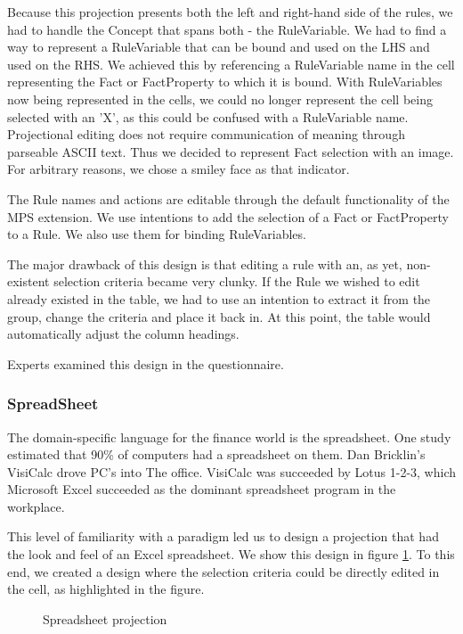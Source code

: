 Because this projection presents both the left and right-hand side of the rules, we had to handle the Concept that spans both - the RuleVariable.
We had to find a way to represent a RuleVariable that can be bound and used on the LHS and used on the RHS.
We achieved this by referencing a RuleVariable name in the cell representing the Fact or FactProperty to which it is bound.
With RuleVariables now being represented in the cells, we could no longer represent the cell being selected with an 'X', as this could be confused with a RuleVariable name.
Projectional editing does not require communication of meaning through parseable ASCII text.
Thus we decided to represent Fact selection with an image.
For arbitrary reasons, we chose a smiley face as that indicator.

The Rule names and actions are editable through the default functionality of the MPS extension.
We use intentions to add the selection of a Fact or FactProperty to a Rule.
We also use them for binding RuleVariables.

The major drawback of this design is that editing a rule with an, as yet, non-existent selection criteria became very clunky.
If the Rule we wished to edit already existed in the table, we had to use an intention to extract it from the group, change the criteria and place it back in.
At this point, the table would automatically adjust the column headings.

Experts examined this design in the questionnaire.

\subsubsection{SpreadSheet}

The domain-specific language for the finance world is the spreadsheet.
One study estimated that 90\% of computers had a spreadsheet on them\cite{bradley2009using}.
Dan Bricklin's VisiCalc drove PC's into The office.
VisiCalc was succeeded by Lotus 1-2-3, which Microsoft Excel succeeded as the dominant spreadsheet program in the workplace.

This level of familiarity with a paradigm led us to design a projection that had the look and feel of an Excel spreadsheet.
We show this design in figure \ref{fig:SpreadsheetProjection}.
To this end, we created a design where the selection criteria could be directly edited in the cell, as highlighted in the figure.

\begin{figure}[h]
    \centering
    \caption{Spreadsheet projection}
    \label{fig:SpreadsheetProjection}
\end{figure}

